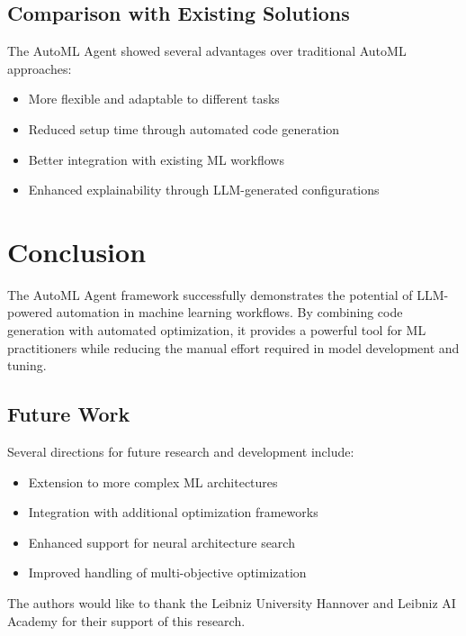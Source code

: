 \documentclass[11pt]{article}
\begin{document}
\subsection{Comparison with Existing Solutions}
The AutoML Agent showed several advantages over traditional AutoML approaches:
\begin{itemize}
    \item More flexible and adaptable to different tasks
    \item Reduced setup time through automated code generation
    \item Better integration with existing ML workflows
    \item Enhanced explainability through LLM-generated configurations
\end{itemize}

\section{Conclusion}
The AutoML Agent framework successfully demonstrates the potential of LLM-powered automation in machine learning workflows. By combining code generation with automated optimization, it provides a powerful tool for ML practitioners while reducing the manual effort required in model development and tuning.

\subsection{Future Work}
Several directions for future research and development include:
\begin{itemize}
    \item Extension to more complex ML architectures
    \item Integration with additional optimization frameworks
    \item Enhanced support for neural architecture search
    \item Improved handling of multi-objective optimization
\end{itemize}

\begin{acknowledgements}
The authors would like to thank the Leibniz University Hannover and Leibniz AI Academy for their support of this research.
\end{acknowledgements}


\end{document}

